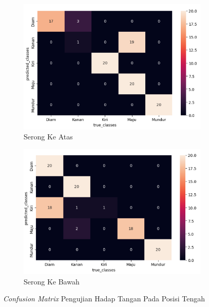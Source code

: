 \begin{enumerate}
\begin{figure}[H]
\begin{subfigure}{0.4\textwidth}
      \includegraphics[width=\linewidth]{../Gambar/cmtengahatas.png}
      \caption{Serong Ke Atas}
      \label{fig:cmtengahatas}
    \end{subfigure}
    \begin{subfigure}{0.4\textwidth}
      \centering
      \includegraphics[width=\linewidth]{../Gambar/cmtengahbawah.png}
      \caption{Serong Ke Bawah}
      \label{fig:cmtengahbawah}
    \end{subfigure}
    \centering
    \caption{\emph{Confusion Matrix} Pengujian Hadap Tangan Pada Posisi Tengah}
    \label{fig:cmtengah}
  \end{figure}


\end{enumerate}
